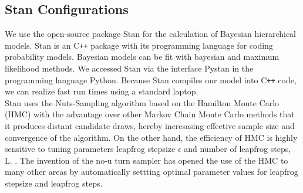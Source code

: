 \subsection{Stan Configurations}
We use the open-source package Stan for the calculation of  Bayesian hierarchical models. Stan is an  C\texttt{++} package with its programming language for coding probability models.  Bayesian models can be fit with bayesian and maximum likelihood methods. We accessed Stan via the interface Pystan in the programming language Python. Because Stan compiles our model into C\texttt{++} code, we can realize fast run times using a standard laptop.\\
Stan uses the Nuts-Sampling algorithm based on the Hamilton Monte Carlo (HMC) with the advantage  over other Markov Chain Monte Carlo methods that it produces distant candidate draws, hereby incresasing effective sample size and convergence of the algorithm.
On the other hand, the efficiency of HMC is highly sensitive to tuning parameters leapfrog stepsize $\epsilon$ and number of leapfrog steps, L. \cite{neal2011}. %
The invention of the no-u turn sampler has opened the use of the HMC to many other areas by automatically settting optimal parameter values for leapfrog stepsize and leapfrog steps.\cite{hoffman2014}  \\
